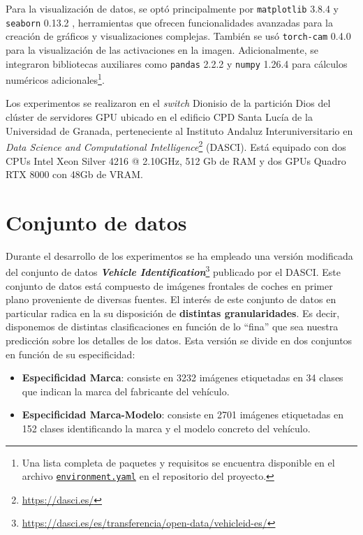 Para la visualización de datos, se optó principalmente por \texttt{matplotlib} 3.8.4
\cite{hunter2007matplotlib} y \texttt{seaborn} 0.13.2
\cite{michael_waskom_2017_883859}, herramientas que ofrecen funcionalidades avanzadas
para la creación de gráficos y visualizaciones complejas. También se usó \texttt{torch-cam}
0.4.0 \cite{torcham2020} para la visualización de las activaciones en la imagen.
Adicionalmente, se integraron bibliotecas auxiliares como \texttt{pandas} 2.2.2
\cite{mckinney2010data} y \texttt{numpy} 1.26.4 \cite{2020NumPy-Array} para
cálculos numéricos adicionales\footnote{Una lista completa de paquetes y
	requisitos se encuentra disponible en el archivo
	\href{https://github.com/pab1s/tda-nn-analysis/blob/main/environment.yaml}{\texttt{environment.yaml}}
	en el repositorio del proyecto.}.

Los experimentos se realizaron en el \textit{switch} Dionisio de la partición
Dios del clúster de servidores GPU ubicado en el edificio CPD Santa Lucía de la
Universidad de Granada, perteneciente al Instituto Andaluz Interuniversitario en
\textit{Data Science and Computational Intelligence}\footnote{\href{https://dasci.es/}{https://dasci.es/}}
(DASCI). Está equipado con dos CPUs Intel Xeon Silver 4216 @ 2.10GHz, 512 Gb de
RAM y dos GPUs Quadro RTX 8000 con 48Gb de VRAM.

\section{Conjunto de datos}

Durante el desarrollo de los experimentos se ha empleado una versión modificada del
conjunto de datos \textbf{\textit{Vehicle Identification}}\footnote{\href{https://dasci.es/es/transferencia/open-data/vehicleid-es/}{https://dasci.es/es/transferencia/open-data/vehicleid-es/}}
publicado por el DASCI. Este conjunto de datos está compuesto de imágenes
frontales de coches en primer plano proveniente de diversas fuentes. El interés de
este conjunto de datos en particular radica en la su disposición de \textbf{distintas
	granularidades}. Es decir, disponemos de distintas clasificaciones en función de
lo \enquote{fina} que sea nuestra predicción sobre los detalles de los datos.
Esta versión se divide en dos conjuntos en función de su especificidad:

\begin{itemize}
	\item \textbf{Especificidad Marca}: consiste en 3232 imágenes etiquetadas en 34
	clases que indican la marca del fabricante del vehículo.
	
	\item \textbf{Especificidad Marca-Modelo}: consiste en 2701 imágenes etiquetadas
	en 152 clases identificando la marca y el modelo concreto del vehículo.
\end{itemize}

